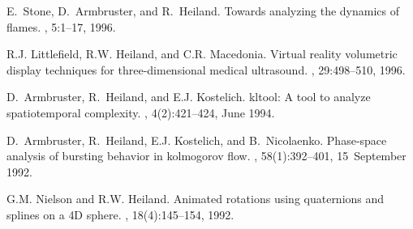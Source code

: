 \documentclass[letterpaper,11pt]{article}
\begin{document}
\begin{enumerate}
E.~Stone, D.~Armbruster, and R.~Heiland.
\newblock Towards analyzing the dynamics of flames.
, 5:1--17, 1996.

R.J. Littlefield, R.W. Heiland, and C.R. Macedonia.
\newblock Virtual reality volumetric display techniques for three-dimensional
medical ultrasound.
, 29:498--510, 1996.

D.~Armbruster, R.~Heiland, and E.J. Kostelich.
\newblock kltool: A tool to analyze spatiotemporal complexity.
, 4(2):421--424, June 1994.

D.~Armbruster, R.~Heiland, E.J. Kostelich, and B.~Nicolaenko.
\newblock Phase-space analysis of bursting behavior in kolmogorov flow.
, 58(1):392--401, 15~September 1992.

G.M. Nielson and R.W. Heiland.
\newblock Animated rotations using quaternions and splines on a {4D} sphere.
, 18(4):145--154, 1992.

\end{enumerate}
	
\end{document}
